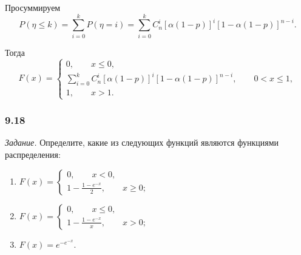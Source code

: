 \begin{enumerate}[label=\alph*)]
Просуммируем
$$P \left( \eta \leq k \right) =
\sum \limits_{i=0}^k P \left( \eta = i \right) =
\sum \limits_{i=0}^k C_n^i \left[ \alpha \left( 1-p \right) \right]^i \left[ 1 - \alpha \left( 1-p \right) \right]^{n-i}.$$

Тогда
$$F \left( x \right) =
\begin{cases}
0, \qquad x \leq 0, \\
\sum \limits_{i=0}^k C_n^i \left[ \alpha \left( 1-p \right) \right]^i \left[ 1 - \alpha \left( 1-p \right) \right]^{n-i}, \qquad 0 < x \leq 1, \\
1, \qquad x > 1.
\end{cases}$$
\end{enumerate}

\subsubsection*{9.18}

\textit{Задание.} Определите, какие из следующих функций являются функциями распределения:
\begin{enumerate}[label=\alph*)]
\item $F \left( x \right) =
\begin{cases}
0, \qquad x < 0, \\
1 - \frac{1-e^{-x}}{2}, \qquad x \geq 0;
\end{cases}$
\item $F \left( x \right) =
\begin{cases}
0, \qquad x \leq 0, \\
1 - \frac{1-e^{-x}}{x}, \qquad x > 0;
\end{cases}$
\item $F \left( x \right) = e^{-e^{-x}}$.
\end{enumerate}

